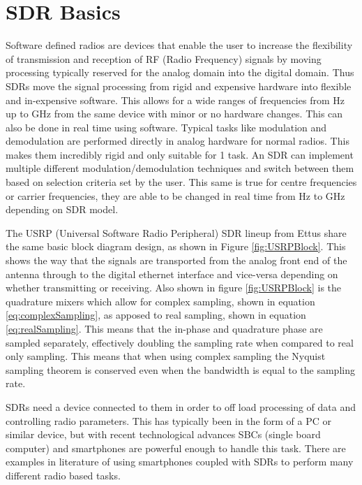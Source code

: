 \section{SDR Basics} \label{sec:SDRBasics}
Software defined radios are devices that enable the user to increase the flexibility of transmission and reception of RF (Radio Frequency) signals by moving processing typically reserved
for the analog domain into the digital domain. Thus SDRs move the signal processing from rigid and expensive hardware into flexible and in-expensive software. This
allows for a wide ranges of frequencies from Hz up to GHz from the same device with minor or no hardware changes. This can also be done in real time using software.
Typical tasks like modulation and demodulation are performed directly in analog hardware for normal radios. This makes them incredibly rigid and only suitable for 1 task.
An SDR can implement multiple different modulation/demodulation techniques and switch between them based on selection criteria set by the user. This same is true for
centre frequencies or carrier frequencies, they are able to be changed in real time from Hz to GHz depending on SDR model.

\bigskip

The USRP (Universal Software Radio Peripheral) SDR lineup from Ettus share the same basic block diagram design, as shown in Figure \ref{fig:USRPBlock}. This shows the way that the signals are transported from the analog
front end of the antenna through to the digital ethernet interface and vice-versa depending on whether transmitting or receiving. Also shown in figure \ref{fig:USRPBlock} is the
quadrature mixers which allow for complex sampling, shown in equation \ref{eq:complexSampling}, as apposed to real sampling, shown in equation \ref{eq:realSampling}. This means that the in-phase and quadrature phase are sampled separately, effectively
doubling the sampling rate when compared to real only sampling. This means that when using complex sampling the Nyquist sampling theorem is conserved even when the
bandwidth is equal to the sampling rate.

\bigskip

SDRs need a device connected to them in order to off load processing of data and controlling radio parameters. This has typically been in the form of a PC or similar
device, but with recent technological advances SBCs (single board computer) and smartphones are powerful enough to handle this task. There are examples in literature of
using smartphones coupled with SDRs to perform many different radio based tasks.

